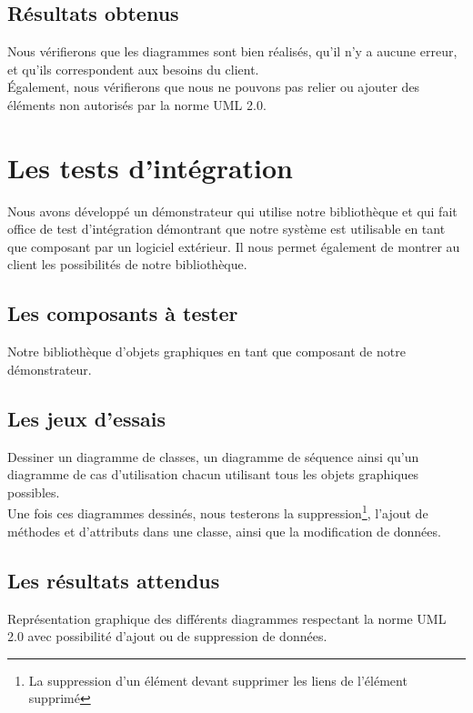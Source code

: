 \documentclass[12pt,a4paper,openany]{report}
\begin{document}
		\subsection{Résultats obtenus}
		Nous vérifierons que les diagrammes sont bien réalisés, qu'il n'y a aucune erreur, et qu'ils correspondent aux besoins du client.\\
		Également, nous vérifierons que nous ne pouvons pas relier ou ajouter des éléments non autorisés par la norme UML 2.0.

	\section{Les tests d'intégration}
		Nous avons développé un démonstrateur qui utilise notre bibliothèque et qui fait office de test d'intégration démontrant que notre système
		est utilisable en tant que composant par un logiciel extérieur. Il nous permet également de montrer au client les possibilités de notre bibliothèque.

		\subsection{Les composants à tester}
			Notre bibliothèque d'objets graphiques en tant que composant de notre démonstrateur.

			\subsection{Les jeux d'essais}
			Dessiner un diagramme de classes, un diagramme de séquence ainsi qu'un diagramme de cas d'utilisation chacun utilisant tous les objets graphiques 
			possibles. \\
			Une fois ces diagrammes dessinés, nous testerons la suppression\footnote{La suppression d'un élément devant supprimer les liens de l'élément supprimé},
			l'ajout de méthodes et d'attributs dans une classe, ainsi que la modification de données.

			\subsection{Les résultats attendus}
			Représentation graphique des différents diagrammes respectant la norme UML 2.0 avec possibilité d'ajout ou de suppression de données.
			\newpage
\end{document}
